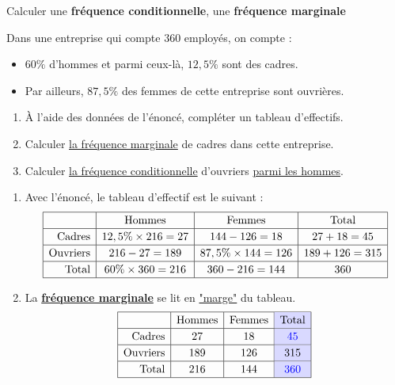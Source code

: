 \begin{methode}{Calculer une \textbf{fréquence conditionnelle}, une \textbf{fréquence marginale}}

	Dans une entreprise qui compte $360$ employés, on compte :
	\begin{itemize}
		\item $60\%$ d'hommes et parmi ceux-là, $12,5\%$ sont des cadres.
		\item Par ailleurs, $87,5\%$ des femmes de cette entreprise sont ouvrières.
	\end{itemize}

	\begin{enumerate}
		\item À l'aide des données de l'énoncé, compléter un tableau d'effectifs.
		\item Calculer \ul{la fréquence marginale} de cadres dans cette entreprise.
		\item Calculer \ul{la fréquence conditionnelle} d'ouvriers \ul{parmi les hommes}.
	\end{enumerate}
	\begin{correction}

		\begin{enumerate}
			\item Avec l'énoncé, le tableau d'effectif est le suivant :
			      $$
				      \def\arraystretch{1.2}
				      \begin{array}{|r|c|c|c|} \hline
					      \text{}         & \text{Hommes}          & \text{Femmes}           & \text{Total}    \\ \hline
					      \text{Cadres}   & 12,5\% \times 216 = 27 & 144 - 126 = 18          & 27 + 18 = 45    \\ \hline
					      \text{Ouvriers} & 216 - 27 = 189         & 87,5\% \times 144 = 126 & 189 + 126 = 315 \\ \hline
					      \text{Total}    & 60\% \times 360 = 216  & 360 - 216 = 144         & 360             \\ \hline
				      \end{array}
			      $$

			\item La \textbf{\ul{fréquence marginale}} se lit en \ul{"marge"} du tableau.
			      $$
				      \def\arraystretch{1.2}
				      \begin{array}{|r|c|c|>{\columncolor{blue!15}}c|} \hline
					      \text{}         & \text{Hommes} & \text{Femmes} & \text{Total}      \\ \hline
					      \text{Cadres}   & 27            & 18            & {\color{blue}45}  \\ \hline
					      \text{Ouvriers} & 189           & 126           & 315               \\ \hline
					      \text{Total}    & 216           & 144           & {\color{blue}360} \\ \hline
				      \end{array}
			      $$


\end{enumerate}
\end{correction}
\end{methode}
